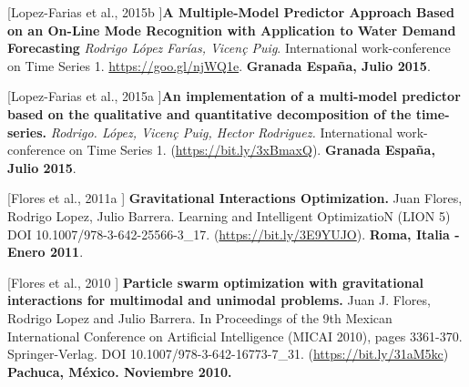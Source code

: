 \begin{innerlist}
\item [[Lopez-Farias et al., 2015b]]\textbf{A Multiple-Model Predictor Approach Based on an On-Line Mode Recognition with Application to Water Demand Forecasting} \textit{Rodrigo López Farías, Vicen\c{c} Puig}.  {International work-conference on Time Series 1. 
} \url{https://goo.gl/njWQ1e}. \textbf{Granada España, Julio 2015}.

\item [[Lopez-Farias et al., 2015a]]\textbf{An implementation of a multi-model predictor based on the qualitative and quantitative decomposition of the time-series.} \textit{Rodrigo. López, Vicen\c{c} Puig, Hector Rodriguez.}  {International work-conference on Time Series 1. (\url{https://bit.ly/3xBmaxQ}). 
} \textbf{Granada España, Julio 2015}.


\item [[Flores et al., 2011a]] \textbf{Gravitational Interactions Optimization.} Juan Flores, Rodrigo Lopez, Julio Barrera. {Learning and Intelligent OptimizatioN}  (LION 5) DOI 10.1007/978-3-642-25566-3\_17. (\url{https://bit.ly/3E9YUJO}). \textbf{Roma, Italia - Enero 2011}. 

\item [[Flores et al., 2010]] \textbf{Particle swarm optimization with gravitational interactions for multimodal and unimodal problems.} Juan J. Flores, Rodrigo Lopez and Julio Barrera.  In {Proceedings of the 9th Mexican International Conference on Artificial Intelligence (MICAI 2010)}, pages 3361-370. Springer-Verlag. DOI 10.1007/978-3-642-16773-7\_31. (\url{https://bit.ly/31aM5kc}) \textbf{Pachuca, México. Noviembre 2010.}

\end{innerlist}
